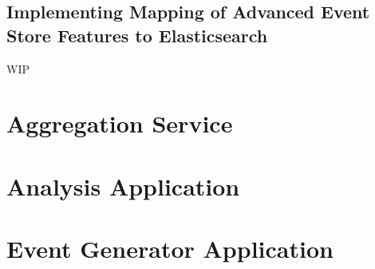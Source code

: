 \subsection{Implementing Mapping of Advanced Event Store Features to Elasticsearch}
\label{subsec:implementation:bridge:mapping}

WIP

\section{Aggregation Service}
\label{sec:implementation:aggregation}

\section{Analysis Application}
\label{sec:implementation:analysis}

\section{Event Generator Application}
\label{sec:implementation:event-generator}


